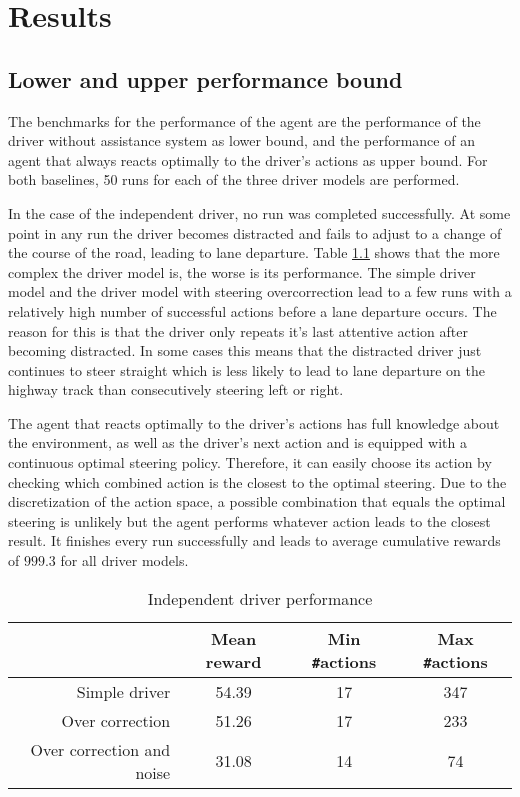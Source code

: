 \chapter{Results}
\label{ch:results}

\section{Lower and upper performance bound}

The benchmarks for the performance of the agent are the performance of the driver without assistance system as lower bound, and the performance of an agent that always reacts optimally to the driver's actions as upper bound. For both baselines, 50 runs for each of the three driver models are performed. 

In the case of the independent driver, no run was completed successfully. At some point in any run the driver becomes distracted and fails to adjust to a change of the course of the road, leading to lane departure. Table \ref{tab:driver_performance} shows that the more complex the driver model is, the worse is its performance. The simple driver model and the driver model with steering overcorrection lead to a few runs with a relatively high number of successful actions before a lane departure occurs. The reason for this is that the driver only repeats it's last attentive action after becoming distracted. In some cases this means that the distracted driver just continues to steer straight which is less likely to lead to lane departure on the highway track than consecutively steering left or right.

The agent that reacts optimally to the driver's actions has full knowledge about the environment, as well as the driver's next action and is equipped with a continuous optimal steering policy. Therefore, it can easily choose its action by checking which combined action is the closest to the optimal steering. Due to the discretization of the action space, a possible combination that equals the optimal steering is unlikely but the agent performs whatever action leads to the closest result. It finishes every run successfully and leads to average cumulative rewards of $999.3$ for all driver models.

\begin{table}[htbp]
\centering
\begin{tabular}{@{}rccc@{}}
\toprule
                            & Mean reward & Min \texttt{\#}actions & Max \texttt{\#}actions \\ \midrule
Simple driver               & 54.39       & 17                     & 347                    \\
Over correction             & 51.26       & 17                     & 233                    \\
Over correction and noise   & 31.08       & 14                     & 74                     \\ \bottomrule
\end{tabular}
\caption{Independent driver performance}
\label{tab:driver_performance}
\end{table}


